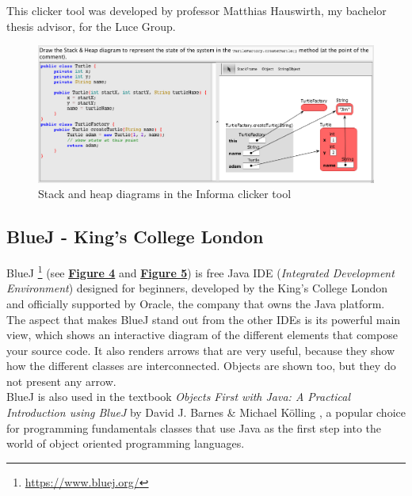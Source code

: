 \documentclass[]{usiinfbachelorproject}
\begin{document}
\noindent This clicker tool was developed by professor Matthias Hauswirth, my bachelor thesis advisor, for the Luce Group.

\begin{figure}[h!]
\includegraphics[scale=0.4]{figures/informa_clicker.png}
\centering
\caption {Stack and heap diagrams in the Informa clicker tool}
\end{figure}

\subsection{BlueJ - King's College London}

BlueJ \footnote{\url{https://www.bluej.org/}} (see \hyperref[bluej_classes_objects]{\textbf{Figure 4}} and \hyperref[bluej_objects_open]{\textbf{Figure 5}}) is free Java IDE (\emph{Integrated Development Environment}) designed for beginners, developed by the King's College London and officially supported by Oracle, the company that owns the Java platform.
The aspect that makes BlueJ stand out from the other IDEs is its powerful main view, which shows an interactive diagram of the different elements that compose your source code. It also renders arrows that are very useful, because they show how the different classes are interconnected. Objects are shown too, but they do not present any arrow.\\
BlueJ is also used in the textbook \emph{Objects First with Java: A Practical Introduction using BlueJ} by David J. Barnes \& Michael K\"{o}lling \cite{barnes2016objects}, a popular choice for programming fundamentals classes that use Java as the first step into the world of object oriented programming languages.
\end{document}
